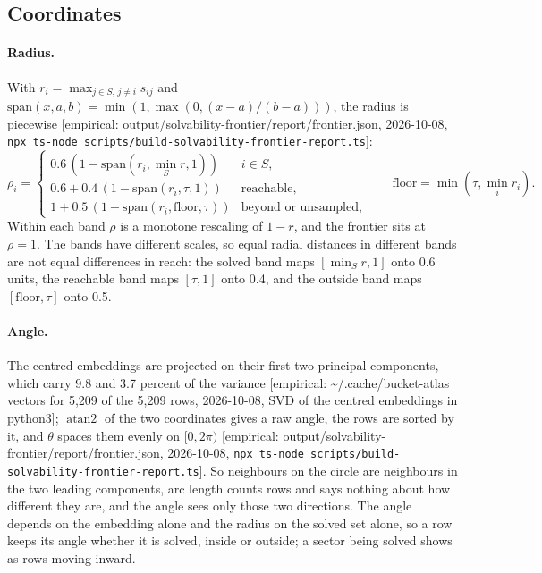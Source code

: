 \documentclass[11pt]{article}
\newcommand{\emp}[1]{\textcolor{bucketgray}{\footnotesize [empirical: #1]}}
\newcommand{\cmd}{\texttt{npx ts-node scripts/build-solvability-frontier-report.ts}}
\newcommand{\fr}{\emp{output/solvability-frontier/report/frontier.json, 2026-10-08, \cmd}}
\newcommand{\pca}{\emp{\textasciitilde/.cache/bucket-atlas vectors for 5,209 of the 5,209 rows, 2026-10-08, SVD of the centred embeddings in python3}}
\begin{document}
\subsection{Coordinates}
\label{sec:coords}

\paragraph{Radius.}
With $r_i = \max_{j \in S,\, j \neq i} s_{ij}$ and $\mathrm{span}(x,a,b) = \min(1, \max(0, (x-a)/(b-a)))$, the radius is piecewise \fr:
\[
\rho_i =
\begin{cases}
0.6\,(1 - \mathrm{span}(r_i, \min_S r, 1)) & i \in S,\\
0.6 + 0.4\,(1 - \mathrm{span}(r_i, \tau, 1)) & \text{reachable},\\
1 + 0.5\,(1 - \mathrm{span}(r_i, \mathrm{floor}, \tau)) & \text{beyond or unsampled},
\end{cases}
\qquad \mathrm{floor} = \min(\tau, \min_i r_i).
\]
Within each band $\rho$ is a monotone rescaling of $1 - r$, and the frontier sits at $\rho = 1$. The bands have different scales, so equal radial distances in different bands are not equal differences in reach: the solved band maps $[\min_S r, 1]$ onto 0.6 units, the reachable band maps $[\tau, 1]$ onto 0.4, and the outside band maps $[\mathrm{floor}, \tau]$ onto 0.5.

\paragraph{Angle.}
The centred embeddings are projected on their first two principal components, which carry 9.8 and 3.7 percent of the variance \pca; $\operatorname{atan2}$ of the two coordinates gives a raw angle, the rows are sorted by it, and $\theta$ spaces them evenly on $[0, 2\pi)$ \fr. So neighbours on the circle are neighbours in the two leading components, arc length counts rows and says nothing about how different they are, and the angle sees only those two directions. The angle depends on the embedding alone and the radius on the solved set alone, so a row keeps its angle whether it is solved, inside or outside; a sector being solved shows as rows moving inward.
\end{document}
